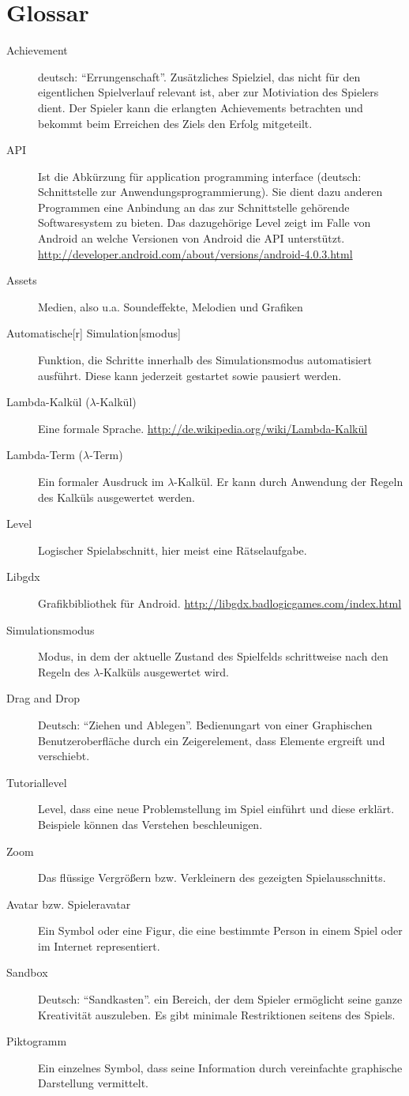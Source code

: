 \section{Glossar}
\begin{description}
	\item[Achievement] deutsch: ``Errungenschaft''. Zusätzliches Spielziel, das nicht für den eigentlichen Spielverlauf relevant ist, aber zur Motiviation des Spielers dient.
		Der Spieler kann die erlangten Achievements betrachten und bekommt beim Erreichen des Ziels den Erfolg mitgeteilt.
	\item[API] Ist die Abkürzung für application programming interface (deutsch: Schnittstelle zur Anwendungsprogrammierung). Sie dient dazu anderen Programmen eine Anbindung an das zur Schnittstelle gehörende Softwaresystem zu bieten. Das dazugehörige Level zeigt im Falle von Android an welche Versionen von Android die API unterstützt. \url{http://developer.android.com/about/versions/android-4.0.3.html}
	\item[Assets] Medien, also u.a. Soundeffekte, Melodien und Grafiken
	\item[Automatische{[}r{]} Simulation{[}smodus{]}] Funktion, die Schritte innerhalb des Simulationsmodus automatisiert ausführt. Diese kann jederzeit gestartet sowie pausiert werden.
	\item[Lambda-Kalkül (\(\lambda\)-Kalkül)] Eine formale Sprache. \url{http://de.wikipedia.org/wiki/Lambda-Kalkül}
	\item[Lambda-Term (\(\lambda\)-Term)] Ein formaler Ausdruck im \(\lambda\)-Kalkül.
		Er kann durch Anwendung der Regeln des Kalküls ausgewertet werden.
	\item[Level] Logischer Spielabschnitt, hier meist eine Rätselaufgabe.
	\item[Libgdx] Grafikbibliothek für Android. \url{http://libgdx.badlogicgames.com/index.html}
	\item[Simulationsmodus] Modus, in dem der aktuelle Zustand des Spielfelds schrittweise nach den Regeln des \(\lambda\)-Kalküls ausgewertet wird.
	\item [Drag and Drop] Deutsch: ``Ziehen und Ablegen''. Bedienungart von  einer Graphischen Benutzeroberfläche durch ein Zeigerelement, dass Elemente ergreift und verschiebt.
	\item[Tutoriallevel] Level, dass eine neue Problemstellung im Spiel einführt und diese erklärt. Beispiele können das Verstehen beschleunigen.
	\item[Zoom] Das flüssige Vergrößern bzw. Verkleinern des gezeigten Spielausschnitts.
	\item [Avatar bzw. Spieleravatar] Ein Symbol oder eine Figur, die eine bestimmte Person in einem Spiel oder im Internet representiert.
	\item [Sandbox] Deutsch: ``Sandkasten''. ein Bereich, der dem Spieler ermöglicht seine ganze Kreativität auszuleben. Es gibt minimale Restriktionen seitens des Spiels.
	\item [Piktogramm] Ein einzelnes Symbol, dass seine Information durch vereinfachte graphische Darstellung vermittelt.
\end{description}
